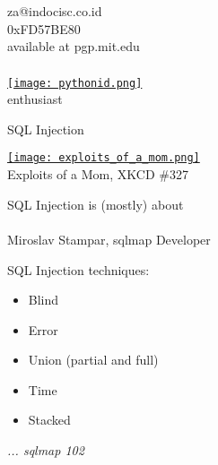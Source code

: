\documentclass[xcolor=pdftex,table,10pt]{beamer}
\begin{document}
\begin{frame}
	\frametitle{}
	\begin{center}
		za@indocisc.co.id \\
		0xFD57BE80 \\
		available at pgp.mit.edu \\
	\end{center}
\end{frame}

\begin{frame}
	\frametitle{}
	\begin{center}
		\href{http://www.python.or.id}{\texttt{[image: pythonid.png]}} \\
		enthusiast \\
	\end{center}
\end{frame}

\begin{frame}
	\begin{center}
		\LARGE{SQL Injection}
	\end{center}
\end{frame}

\begin{frame}
	\begin{center}
		\href{http://xkcd.com/327/}{\texttt{[image: exploits\_of\_a\_mom.png]}}\\
		Exploits of a Mom, XKCD \#327
	\end{center}
\end{frame}

\begin{frame}
	\begin{center}
		\large{SQL Injection is (mostly) about \\ \color{red}{the unauthorized DBMS data access}}\\
		\small{Miroslav Stampar, sqlmap Developer}
	\end{center}
\end{frame}

\begin{frame}
	\begin{center}
		\LARGE{SQL Injection techniques:}	
	\end{center}
	\begin{itemize}
		\item Blind
		\item Error
		\item Union (partial and full)
		\item Time
		\item Stacked
	\end{itemize}
	\begin{flushright}\small{\textit{... sqlmap 102}}\end{flushright}
\end{frame}
\end{document}
